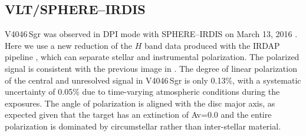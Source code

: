 \documentclass[fleqn,usenatbib,useAMS]{mnras}
\begin{document}

\subsection{VLT/SPHERE--IRDIS}  \label{subsec:SPHERE}

V4046\,Sgr was observed in DPI mode with SPHERE--IRDIS on March 13, 2016 \citep[see][for details]{Avenhaus_2018}. Here we use a new reduction of the $H$ band data produced with the IRDAP pipeline \citep{2020A&A...633A..64V}, which can separate stellar and instrumental polarization. The polarized signal is consistent with the previous image in \citet{Avenhaus_2018}. The degree of linear polarization of the central and unresolved signal in V4046\,Sgr is only 0.13\%, with a systematic uncertainty of 0.05\% due to time-varying atmospheric conditions during the exposures. The angle of polarization is aligned with the disc major axis, as expected given that the target has an extinction of Av=0.0 \citep{2016ApJ...828...69M} and the entire polarization is dominated by circumstellar rather than inter-stellar material.
\end{document}
